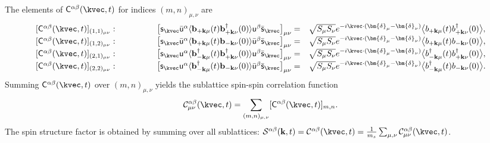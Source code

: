 The elements of $\mathsf{C}^{\alpha\beta}(\kvec, t)$ for indices $(m,n)_{\mu,\nu}$ are
\begin{align*}
    \begin{array}{crl}
        {[\mathsf{C}^{\alpha\beta}(\kvec, t)]_{(1,1)_{\mu\nu}}} : \qquad\qquad
        &
        \big[
            \mathsf{s}_{\kvec} \bar{\mathsf{u}}^{\alpha} 
            \langle \mathbf{b}_{+\mathbf{k}\mu}           (t)    \mathbf{b}_{+\mathbf{k}\nu}^{\dagger} (0)    \rangle 
            \mathsf{u}^{\beta} \bar{\mathsf{s}}_{\kvec} 
        \big]_{\mu\nu}
        = &
        \sqrt{S_{\mu}S_{\nu}}e^{-i \kvec \cdot (\bm{\delta}_{\mu} - \bm{\delta}_{\nu})} 
        \big\langle b_{+\mathbf{k}\mu} (t) b_{+\mathbf{k}\nu}^{\dagger} (0) \big\rangle,
        \\
        {[\mathsf{C}^{\alpha\beta}(\kvec, t)]_{(1,2)_{\mu\nu}}} : \qquad\qquad
        &
        \big[
            \mathsf{s}_{\kvec} \bar{\mathsf{u}}^{\alpha} 
            \langle \mathbf{b}_{+\mathbf{k}\mu}           (t)    \mathbf{b}_{-\mathbf{k}\nu}           (0)    \rangle 
            \bar{\mathsf{u}}^{\beta} \bar{\mathsf{s}}_{\kvec}
        \big]_{\mu\nu}
        = & \sqrt{S_{\mu}S_{\nu}}e^{-i \kvec \cdot (\bm{\delta}_{\mu} - \bm{\delta}_{\nu})} 
        \big\langle b_{+\mathbf{k}\mu} (t) b_{-\mathbf{k}\nu} (0) \big\rangle,
        \\
        {[\mathsf{C}^{\alpha\beta}(\kvec, t)]_{(2,1)_{\mu\nu}}} : \qquad\qquad
        & 
        \big[
            \mathsf{s}_{\kvec} \mathsf{u}^{\alpha}
            \langle \mathbf{b}_{-\mathbf{k}\mu}^{\dagger} (t)    \mathbf{b}_{+\mathbf{k}\nu}^{\dagger} (0)    \rangle  
            \mathsf{u}^{\beta} \bar{\mathsf{s}}_{\kvec}  
        \big]_{\mu\nu}
        = & \sqrt{S_{\mu}S_{\nu}}e^{-i \kvec \cdot (\bm{\delta}_{\mu} - \bm{\delta}_{\nu})} 
        \big\langle b_{-\mathbf{k}\mu}^{\dagger} (t) b_{+\mathbf{k}\nu}^{\dagger} (0) \big\rangle,
        \\
        {[\mathsf{C}^{\alpha\beta}(\kvec, t)]_{(2,2)_{\mu\nu}}} : \qquad\qquad
        &
        \big[
            \mathsf{s}_{\kvec} \mathsf{u}^{\alpha}
            \langle \mathbf{b}_{-\mathbf{k}\mu}^{\dagger} (t)    \mathbf{b}_{-\mathbf{k}\nu}           (0)    \rangle
            \bar{\mathsf{u}}^{\beta} \bar{\mathsf{s}}_{\kvec}
        \big]_{\mu\nu}
        = & \sqrt{S_{\mu}S_{\nu}}e^{-i \kvec \cdot (\bm{\delta}_{\mu} - \bm{\delta}_{\nu})} 
        \big\langle b_{-\mathbf{k}\mu}^{\dagger} (t) b_{-\mathbf{k}\nu} (0) \big\rangle.
    \end{array}
\end{align*}
Summing $\mathsf{C}^{\alpha\beta}(\kvec, t)$ over $(m,n)_{\mu,\nu}$ yields the sublattice spin-spin correlation function
\begin{equation}
    \mathcal{C}_{\mu\nu}^{\alpha\beta} (\kvec, t) = \sum_{(m,n)_{\mu,\nu}} [\mathsf{C}^{\alpha\beta}(\kvec, t)]_{m,n}.
\end{equation}
The spin structure factor is obtained by summing over all sublattices: $\mathcal{S}^{\alpha\beta} (\mathbf{k}, t) = \mathcal{C}^{\alpha\beta} (\kvec, t) = \frac{1}{m_s} \sum_{\mu,\nu} \mathcal{C}_{\mu\nu}^{\alpha\beta} (\kvec, t)$.




